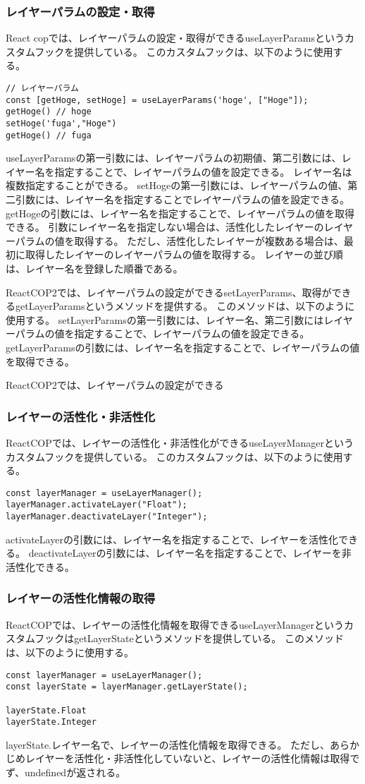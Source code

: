 \documentclass{jsarticle}
\begin{document}
\subsubsection{レイヤーパラムの設定・取得}
React copでは、レイヤーパラムの設定・取得ができるuseLayerParamsというカスタムフックを提供している。
このカスタムフックは、以下のように使用する。
\begin{lstlisting}[]
// レイヤーパラム
const [getHoge, setHoge] = useLayerParams('hoge', ["Hoge"]);
getHoge() // hoge
setHoge('fuga',"Hoge")
getHoge() // fuga

\end{lstlisting}
useLayerParamsの第一引数には、レイヤーパラムの初期値、第二引数には、レイヤー名を指定することで、レイヤーパラムの値を設定できる。
レイヤー名は複数指定することができる。
setHogeの第一引数には、レイヤーパラムの値、第二引数には、レイヤー名を指定することでレイヤーパラムの値を設定できる。
getHogeの引数には、レイヤー名を指定することで、レイヤーパラムの値を取得できる。
引数にレイヤー名を指定しない場合は、活性化したレイヤーのレイヤーパラムの値を取得する。
ただし、活性化したレイヤーが複数ある場合は、最初に取得したレイヤーのレイヤーパラムの値を取得する。
レイヤーの並び順は、レイヤー名を登録した順番である。

ReactCOP2では、レイヤーパラムの設定ができるsetLayerParams、取得ができるgetLayerParamsというメソッドを提供する。
このメソッドは、以下のように使用する。
setLayerParamsの第一引数には、レイヤー名、第二引数にはレイヤーパラムの値を指定することで、レイヤーパラムの値を設定できる。
getLayerParamsの引数には、レイヤー名を指定することで、レイヤーパラムの値を取得できる。

ReactCOP2では、レイヤーパラムの設定ができる
\subsubsection{レイヤーの活性化・非活性化}
ReactCOPでは、レイヤーの活性化・非活性化ができるuseLayerManagerというカスタムフックを提供している。
このカスタムフックは、以下のように使用する。
\begin{lstlisting}[]
const layerManager = useLayerManager();
layerManager.activateLayer("Float");
layerManager.deactivateLayer("Integer");
\end{lstlisting}
activateLayerの引数には、レイヤー名を指定することで、レイヤーを活性化できる。
deactivateLayerの引数には、レイヤー名を指定することで、レイヤーを非活性化できる。

\subsubsection{レイヤーの活性化情報の取得}
ReactCOPでは、レイヤーの活性化情報を取得できるuseLayerManagerというカスタムフックはgetLayerStateというメソッドを提供している。
このメソッドは、以下のように使用する。
\begin{lstlisting}[]
const layerManager = useLayerManager();
const layerState = layerManager.getLayerState();

layerState.Float
layerState.Integer
\end{lstlisting}
layerState.{レイヤー名}で、レイヤーの活性化情報を取得できる。
ただし、あらかじめレイヤーを活性化・非活性化していないと、レイヤーの活性化情報は取得でず、undefinedが返される。
\end{document}
